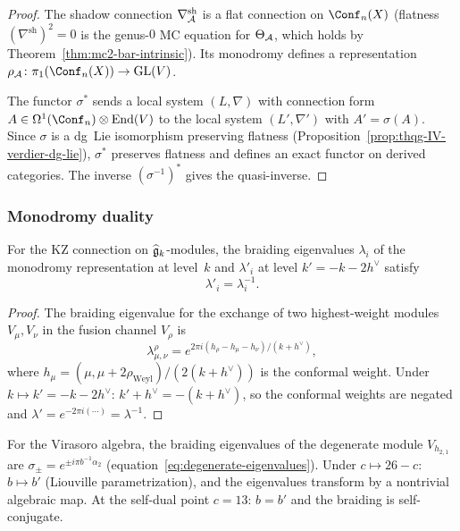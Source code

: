 \begin{proof}
The shadow connection $\nabla^{\mathrm{sh}}_{\mathcal{A}}$ is a flat connection on
$\Conf_n(X)$ (flatness $(\nabla^{\mathrm{sh}})^2 = 0$ is
the genus-$0$ MC equation for $\Theta_{\mathcal{A}}$, which holds by
Theorem~\ref{thm:mc2-bar-intrinsic}). Its monodromy defines a
representation $\rho_\cA\colon \pi_1(\Conf_n(X)) \to \mathrm{GL}(V)$.

The functor $\sigma^*$ sends a local system $(L, \nabla)$ with
connection form $A \in \Omega^1(\Conf_n) \otimes \End(V)$ to the
local system $(L', \nabla')$ with $A' = \sigma(A)$. Since $\sigma$
is a dg~Lie isomorphism preserving flatness
(Proposition~\ref{prop:thqg-IV-verdier-dg-lie}), $\sigma^*$ preserves
flatness and defines an exact functor on derived categories.
The inverse $(\sigma^{-1})^*$ gives the quasi-inverse.
\end{proof}

\subsubsection{Monodromy duality}

\begin{proposition}
\label{prop:thqg-IV-monodromy-duality}
For the KZ connection on $\widehat{\mathfrak{g}}_k$-modules, the braiding
eigenvalues $\lambda_i$ of the monodromy representation at level~$k$
and $\lambda'_i$ at level $k' = -k - 2h^\vee$ satisfy
\begin{equation}\label{eq:thqg-IV-monodromy-reciprocation}
\lambda'_i = \lambda_i^{-1}.
\end{equation}
\end{proposition}

\begin{proof}
The braiding eigenvalue for the exchange of two highest-weight modules
$V_\mu, V_\nu$ in the fusion channel $V_\rho$ is
\[
\lambda_{\mu,\nu}^\rho
= e^{2\pi i (h_\rho - h_\mu - h_\nu)/(k + h^\vee)},
\]
where $h_\mu = (\mu, \mu + 2\rho_{\mathrm{Weyl}})/(2(k + h^\vee))$ is
the conformal weight. Under $k \mapsto k' = -k - 2h^\vee$:
$k' + h^\vee = -(k + h^\vee)$, so the conformal weights are negated
and $\lambda' = e^{-2\pi i(\cdots)} = \lambda^{-1}$.
\end{proof}

\begin{remark}
\label{rem:thqg-IV-virasoro-braiding}
For the Virasoro algebra, the braiding eigenvalues of the degenerate
module $V_{h_{2,1}}$ are $\sigma_\pm = e^{\pm i\pi b^{-1}\alpha_2}$
(equation~\eqref{eq:degenerate-eigenvalues}). Under $c \mapsto 26-c$:
$b \mapsto b'$ (Liouville parametrization), and the eigenvalues
transform by a nontrivial algebraic map. At the self-dual point
$c = 13$: $b = b'$ and the braiding is self-conjugate.
\end{remark}

